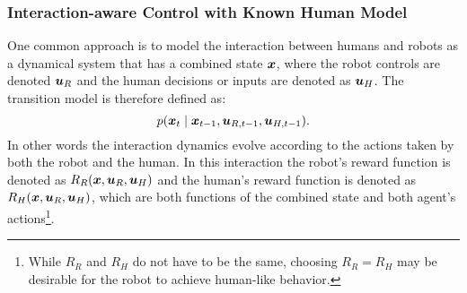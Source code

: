 \subsubsection{Interaction-aware Control with Known Human Model}
One common approach is to model the interaction between humans and robots as a dynamical system that has a combined state $\bm{x}$, where the robot controls are denoted $\bm{u}_R$ and the human decisions or inputs are denoted as $\bm{u}_H$. The transition model is therefore defined as:
\begin{equation*}
p(\bm{x}_t \mid \bm{x}_{t-1}, \bm{u}_{R, t-1}, \bm{u}_{H, t-1}).
\end{equation*}
In other words the interaction dynamics evolve according to the actions taken by both the robot and the human. In this interaction the robot's reward function is denoted as $R_R(\bm{x}, \bm{u}_R, \bm{u}_H)$ and the human's reward function is denoted as $R_H(\bm{x}, \bm{u}_R, \bm{u}_H)$, which are both functions of the combined state and both agent's actions\footnote{While $R_R$ and $R_H$ do not have to be the same, choosing $R_R = R_H$ may be desirable for the robot to achieve human-like behavior.}. 

